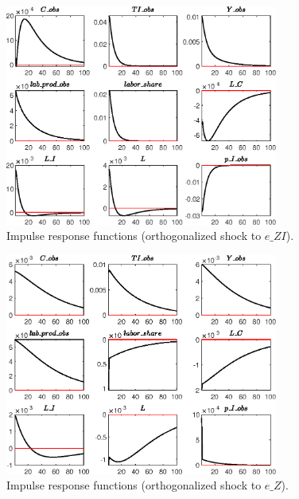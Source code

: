  
\begin{figure}[H]
\centering 
\includegraphics[width=0.80\textwidth]{directed_search_est/graphs/directed_search_est_IRF_e_ZI}
\caption{Impulse response functions (orthogonalized shock to $e\_ZI$).}
\label{Fig:IRF:e_ZI}
\end{figure}
 
\begin{figure}[H]
\centering 
\includegraphics[width=0.80\textwidth]{directed_search_est/graphs/directed_search_est_IRF_e_Z}
\caption{Impulse response functions (orthogonalized shock to $e\_Z$).}
\label{Fig:IRF:e_Z}
\end{figure}
 
